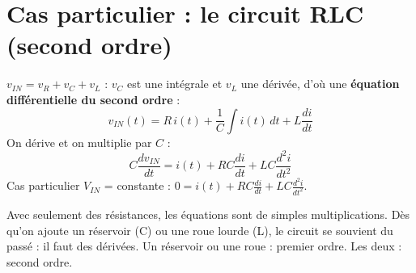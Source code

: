 \section{Cas particulier : le circuit RLC (second ordre)}


\begin{thmbox}[title=Circuit RLC]
$v_{IN} = v_R + v_C + v_L$ : $v_C$ est une intégrale et $v_L$ une dérivée, d'où une
\textbf{équation différentielle du second ordre} :
\[ v_{IN}(t) = R\,i(t) + \frac1C\int i(t)\,dt + L\frac{di}{dt} \]
On dérive et on multiplie par $C$ :
\[ C\frac{dv_{IN}}{dt} = i(t) + RC\frac{di}{dt} + LC\frac{d^2 i}{dt^2} \]
Cas particulier $V_{IN}$ = constante : $0 = i(t) + RC\frac{di}{dt} + LC\frac{d^2i}{dt^2}$.
\end{thmbox}

\begin{goatbox}
Avec seulement des résistances, les équations sont de simples multiplications. Dès qu'on
ajoute un réservoir (C) ou une roue lourde (L), le circuit \og se souvient\fg{} du passé :
il faut des dérivées. Un réservoir ou une roue : premier ordre. Les deux : second ordre.
\end{goatbox}

